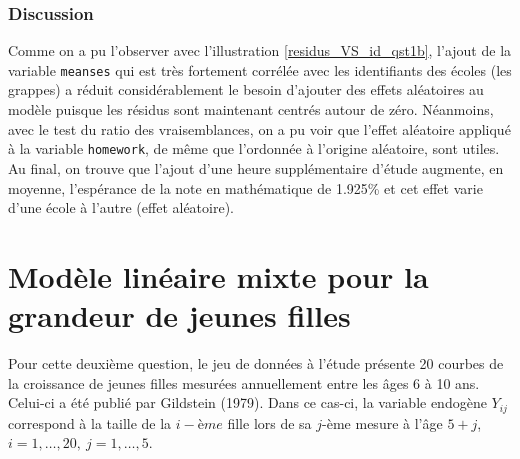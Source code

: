 \documentclass{article}
\begin{document}
	\subsubsection*{Discussion}
		Comme on a pu l'observer avec l'illustration \ref{residus_VS_id_qst1b}, l'ajout de la variable \texttt{meanses} qui est très fortement corrélée avec les identifiants des écoles (les grappes) a réduit considérablement le besoin d'ajouter des effets aléatoires au modèle puisque les résidus sont maintenant centrés autour de zéro. Néanmoins, avec le test du ratio des vraisemblances, on a pu voir que l'effet aléatoire appliqué à la variable \texttt{homework}, de même que l'ordonnée à l'origine aléatoire, sont utiles.\\
		
		Au final, on trouve que l'ajout d'une heure supplémentaire d'étude augmente, en moyenne, l'espérance de la note en mathématique de 1.925\% et cet effet varie d'une école à l'autre (effet aléatoire).
	
\section{Modèle linéaire mixte pour la grandeur de jeunes filles}
	Pour cette deuxième question, le jeu de données à l'étude présente 20 courbes de la croissance de jeunes filles mesurées annuellement entre les âges 6 à 10 ans. Celui-ci a été publié par Gildstein (1979). Dans ce cas-ci, la variable endogène $Y_{ij}$ correspond à la taille de la $i-ème$ fille lors de sa $j$-ème mesure à l'âge $5+j$, $i=1,\dots,20,\ j=1,\dots,5$.
	
\end{document}
